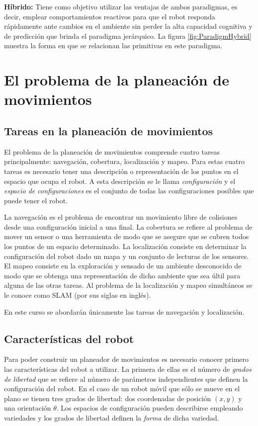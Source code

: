 \textbf{Híbrido:} Tiene como objetivo utilizar las ventajas de ambos paradigmas, es decir, emplear comportamientos reactivos para que el robot responda rápidamente ante cambios en el ambiente sin perder la alta capacidad cognitiva y de predicción que brinda el paradigma jerárquico. La figura \ref{fig:ParadigmHybrid} muestra la forma en que se relacionan las primitivas en este paradigma. 


\section{El problema de la planeación de movimientos}
\subsection{Tareas en la planeación de movimientos}
\label{sec:Tasks}

El problema de la planeación de movimientos comprende cuatro tareas principalmente: navegación, cobertura, localización y mapeo. 
Para estas cuatro tareas es necesario tener una descripción o representación de los puntos en el espacio que ocupa el robot. A esta descripción se le llama \textit{configuración} y el \textit{espacio de configuraciones} es el conjunto de todas las configuraciones posibles que puede tener el robot.

La navegación es el problema de encontrar un movimiento libre de colisiones desde una configuración inicial a una final. La cobertura se refiere al problema de mover un sensor o una herramienta de modo que se asegure que se cubren todos los puntos de un espacio determinado. La localización consiste en determinar la configuración del robot dado un mapa y un conjunto de lecturas de los sensores. El mapeo consiste en la exploración y sensado de un ambiente desconocido de modo que se obtenga una representación de dicho ambiente que sea últil para alguna de las otras tareas. Al problema de la localización y mapeo simultáneos se le conoce como SLAM (por sus siglas en inglés). 

En este curso se abordarán únicamente las tareas de navegación y localización. 

\subsection{Características del robot}
Para poder construir un planeador de movimientos es necesario conocer primero las características del robot a utilizar. La primera de ellas es el número de \textit{grados de libertad} que se refiere al número de parámetros independientes que definen la configuración del robot. En el caso de un robot móvil que sólo se mueve en el plano se tienen tres grados de libertad: dos coordenadas de posición $(x,y)$ y una orientación $\theta$. Los espacios de configuración pueden describirse empleando variedades y los grados de libertad definen la \textit{forma} de dicha variedad.

